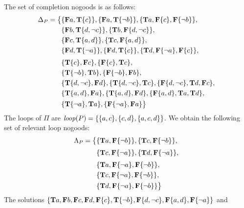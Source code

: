\begin{Loesung}%
\noindent\textnormal{%
The set of completion nogoods is as follows:
\begin{align*}
  \Delta_P = \big\{ &    
  \{\mathbf{F}a,\mathbf{T}\{c\}\},\{\mathbf{F}a,\mathbf{T}\{{\neg{b}}\}\},
  \{\mathbf{T}a,\mathbf{F}\{c\},\mathbf{F}\{{\neg{b}}\}\},
  {} \\ &
  \{\mathbf{F}b,\mathbf{T}\{d,{\neg{c}}\}\},\{\mathbf{T}b,\mathbf{F}\{d,{\neg{c}}\}\},
  {} \\ &
  \{\mathbf{F}c,\mathbf{T}\{a,d\}\},\{\mathbf{T}c,\mathbf{F}\{a,d\}\},
  {} \\ &
  \{\mathbf{F}d,\mathbf{T}\{{\neg{a}}\}\},\{\mathbf{F}d,\mathbf{T}\{c\}\},
  \{\mathbf{T}d,\mathbf{F}\{{\neg{a}}\},\mathbf{F}\{c\}\},
  {} \\[1mm] &
  \{\mathbf{T}\{c\},\mathbf{F}c\},
  \{\mathbf{F}\{c\},\mathbf{T}c\},
  {} \\ &
  \{\mathbf{T}\{{\neg{b}}\},\mathbf{T}b\},
  \{\mathbf{F}\{{\neg{b}}\},\mathbf{F}b\},
  {} \\ &
  \{\mathbf{T}\{d,{\neg{c}}\},\mathbf{F}d\},
  \{\mathbf{T}\{d,{\neg{c}}\},\mathbf{T}c\},
  \{\mathbf{F}\{d,{\neg{c}}\},\mathbf{T}d,\mathbf{F}c\},
  {} \\ &
  \{\mathbf{T}\{a,d\},\mathbf{F}a\},
  \{\mathbf{T}\{a,d\},\mathbf{F}d\},
  \{\mathbf{F}\{a,d\},\mathbf{T}a,\mathbf{T}d\},
  {} \\ &
  \{\mathbf{T}\{{\neg{a}}\},\mathbf{T}a\},
  \{\mathbf{F}\{{\neg{a}}\},\mathbf{F}a\}
  \big\}
\end{align*}
The loops of $\Pi$ are $\mathit{loop}(P)=\{\{a,c\},\{c,d\},\{a,c,d\}\}$.
We obtain the following set of relevant loop nogoods:
\begin{align*}
  \Lambda_\Pi%
  = \big\{ &    
  \{\mathbf{T}a,\mathbf{F}\{\naf b\}\},
  \{\mathbf{T}c,\mathbf{F}\{\naf b\}\},
  {} \\[1mm] &  
  \{\mathbf{T}c,\mathbf{F}\{\naf a\}\},
  \{\mathbf{T}d,\mathbf{F}\{\naf a\}\},
  {} \\[1mm] &  
  \{\mathbf{T}a,\mathbf{F}\{\naf a\},\mathbf{F}\{\naf b\}\},
  {} \\ &
  \{\mathbf{T}c,\mathbf{F}\{\naf a\},\mathbf{F}\{\naf b\}\},
  {} \\ &
  \{\mathbf{T}d,\mathbf{F}\{\naf a\},\mathbf{F}\{\naf b\}\}
  \big\}
\end{align*}
The solutions
$\{\mathbf{T}a,\mathbf{F}b,\mathbf{F}c,\mathbf{F}d,
   \mathbf{F}\{c\},\mathbf{T}\{{\neg{b}}\},\mathbf{F}\{d,{\neg{c}}\},\mathbf{F}\{a,d\},\mathbf{F}\{{\neg{a}}\}\}$
and\linebreak[4]%
}
\end{Loesung}
